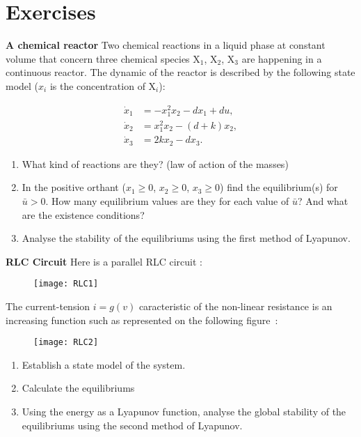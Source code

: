 \section{Exercises}

\begin{exercice}{\bf A chemical reactor}
Two chemical reactions in a liquid phase at constant volume that concern three chemical species X$_1$, X$_2$, X$_3$ are happening in a continuous reactor. The dynamic of the reactor is described by the following state model ($x_i$ is the concentration of X$_i$):

\begin{align*}
\dot x_1 &= -x_1^2x_2 - dx_1 + du, \\
\dot x_2 &= x_1^2x_2 - (d+k)x_2, \\
\dot x_3 &= 2kx_2 - dx_3.
\end{align*}
\begin{enumerate}
\item What kind of reactions are they? (law of action of the masses)
\item In the positive orthant ($x_1 \geq 0$, $x_2 \geq 0$, $x_3 \geq 0$) find the equilibrium(s) for $\bar u > 0$. How many equilibrium values are they for each value of $\bar u$? And what are the existence conditions?
\item Analyse the stability of the equilibriums using the first method of Lyapunov.
\end{enumerate}
\end{exercice}
\vv

\begin{exercice}{\bf RLC Circuit}
Here is a parallel RLC circuit :
\begin{figure}[h]
\begin{center}
\texttt{[image: RLC1]}
\end{center}
\end{figure}

\noindent The current-tension $i=g(v)$ caracteristic of the non-linear resistance is an increasing function such as represented on the following figure~:
\begin{figure}[h]
\begin{center}
\texttt{[image: RLC2]}
\end{center}
\end{figure}
\begin{enumerate}
\item Establish a state model of the system.
\item Calculate the equilibriums
\item Using the energy as a Lyapunov function, analyse the global stability of the equilibriums using the second method of Lyapunov.
\end{enumerate}
\end{exercice}
\vv

